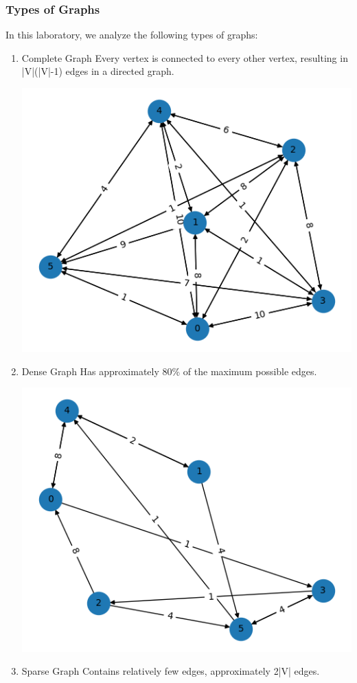 \documentclass[a4paper,12pt]{article}
\begin{document}
\subsubsection{Types of Graphs}
\label{sec:orgf84a46a}
In this laboratory, we analyze the following types of graphs:
\begin{enumerate}
\item Complete Graph
\label{sec:org5c2e3f4}
Every vertex is connected to every other vertex, resulting in |V|(|V|-1) edges in a directed graph.

\begin{center}
\includegraphics[width=.9\linewidth]{example_complete.png}
\label{orgb8750ea}
\end{center}
\item Dense Graph
\label{sec:orge721fa7}
Has approximately 80\% of the maximum possible edges.

\begin{center}
\includegraphics[width=.9\linewidth]{example_dense.png}
\label{orgbeee645}
\end{center}
\item Sparse Graph
\label{sec:orgb8611be}
Contains relatively few edges, approximately 2|V| edges.


\end{enumerate}
\end{document}
